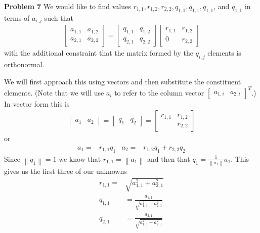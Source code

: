 \documentclass[12pt]{article}
\newcommand{\problem}[1]{\hspace{-4 ex} \large \textbf{Problem #1} }
\newcommand{\norm}[1]{\left\lVert#1\right\rVert}
\begin{document}
\bigbreak

\problem{7} We would like to find values $r_{1,1}, r_{1,2}, r_{2,2}, q_{1,1}, q_{1,1}, q_{1,1}$, and $q_{1,1}$ in terms of $a_{i,j}$ such that 
\begin{align*}
	\begin{bmatrix}
	a_{1,1} & a_{1,2} \\
	a_{2,1} & a_{2,2}
	\end{bmatrix}
	=
	\begin{bmatrix}
	q_{1,1} & q_{1,2} \\
	q_{2,1} & q_{2,2}
	\end{bmatrix}
	\begin{bmatrix}
		r_{1,1} & r_{1,2} \\
		0 & r_{2,2}
	\end{bmatrix}
\end{align*}
with the additional constraint that the matrix formed by the $q_{i,j}$ elements is orthonormal. 

\bigbreak

We will first approach this using vectors and then substitute the constituent elements. (Note that we will use $a_i$ to refer to the column vector $\begin{bmatrix}a_{1,i} & a_{2,i} \end{bmatrix}^T$.) In vector form this is
\begin{align*}
	\begin{bmatrix} a_1 & a_2 \end{bmatrix} = \begin{bmatrix} q_1 & q_2 \end{bmatrix} = \begin{bmatrix} r_{1,1} & r_{1,2} \\ & r_{2,2} \end{bmatrix}
\end{align*}
or
\begin{align*}
	a_1 = & r_{1,1}q_1 & a_2 = & r_{1,2}q_1 + r_{2,2}q_2
\end{align*}
Since $\norm{q_1} = 1$ we know that $r_{1,1} = \norm{a_1}$ and then that $q_1 = \frac{1}{\norm{a_1}}a_1$. This gives us the first three of our unknowns
\begin{align}
	r_{1,1} = & \sqrt{a_{1,1}^2 + a_{2,1}^2} \\
	q_{1,1} & = \frac{a_{1,1}}{\sqrt{a_{1,1}^2 + a_{2,1}^2}}  \\
	q_{2,1} & = \frac{a_{2,1}}{\sqrt{a_{1,1}^2 + a_{2,1}^2}} 
\end{align}
\end{document}
